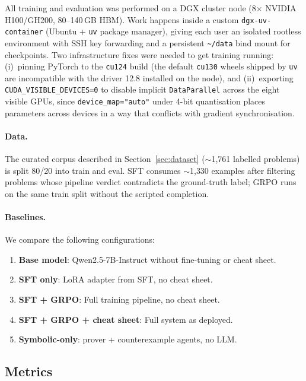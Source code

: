 \documentclass{article}
\begin{document}
All training and evaluation was performed on a DGX cluster node (8$\times$ NVIDIA H100/GH200, 80--140\,GB HBM). Work happens inside a custom \texttt{dgx-uv-container} (Ubuntu + \texttt{uv} package manager), giving each user an isolated rootless environment with SSH key forwarding and a persistent \texttt{\~{}/data} bind mount for checkpoints. Two infrastructure fixes were needed to get training running: (i)~pinning PyTorch to the \texttt{cu124} build (the default \texttt{cu130} wheels shipped by \texttt{uv} are incompatible with the driver 12.8 installed on the node), and (ii)~exporting \texttt{CUDA\_VISIBLE\_DEVICES=0} to disable implicit \texttt{DataParallel} across the eight visible GPUs, since \texttt{device\_map="auto"} under 4-bit quantisation places parameters across devices in a way that conflicts with gradient synchronisation.

\paragraph{Data.} The curated corpus described in Section~\ref{sec:dataset} ($\sim$1{,}761 labelled problems) is split 80/20 into train and eval. SFT consumes $\sim$1{,}330 examples after filtering problems whose pipeline verdict contradicts the ground-truth label; GRPO runs on the same train split without the scripted completion.

\paragraph{Baselines.} We compare the following configurations:
\begin{enumerate}[label=(\alph*),itemsep=1pt]
  \item \textbf{Base model}: Qwen2.5-7B-Instruct without fine-tuning or cheat sheet.
  \item \textbf{SFT only}: LoRA adapter from SFT, no cheat sheet.
  \item \textbf{SFT + GRPO}: Full training pipeline, no cheat sheet.
  \item \textbf{SFT + GRPO + cheat sheet}: Full system as deployed.
  \item \textbf{Symbolic-only}: prover + counterexample agents, no LLM.
\end{enumerate}

\subsection{Metrics}
\end{document}
